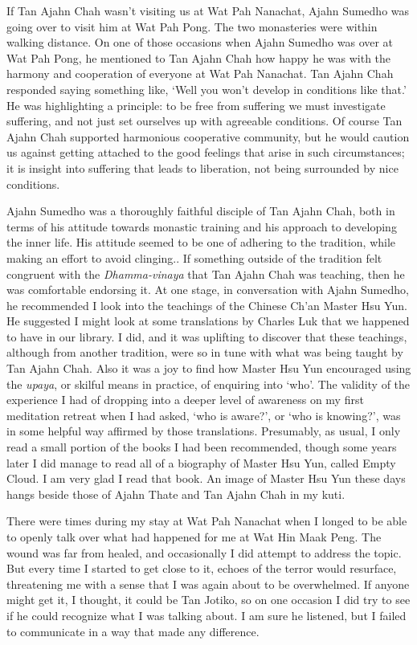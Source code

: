 If Tan Ajahn Chah wasn't visiting us at Wat Pah Nanachat, Ajahn Sumedho
was going over to visit him at Wat Pah Pong. The two monasteries were
within walking distance. On one of those occasions when Ajahn Sumedho
was over at Wat Pah Pong, he mentioned to Tan Ajahn Chah how happy he
was with the harmony and cooperation of everyone at Wat Pah Nanachat.
Tan Ajahn Chah responded saying something like, `Well you won't develop
in conditions like that.' He was highlighting a principle: to be free
from suffering we must investigate suffering, and not just set ourselves
up with agreeable conditions. Of course Tan Ajahn Chah supported
harmonious cooperative community, but he would caution us against
getting attached to the good feelings that arise in such circumstances;
it is insight into suffering that leads to liberation, not being
surrounded by nice conditions.

Ajahn Sumedho was a thoroughly faithful disciple of Tan Ajahn Chah, both
in terms of his attitude towards monastic training and his approach to
developing the inner life. His attitude seemed to be one of adhering to
the tradition, while making an effort to avoid clinging.. If something outside of the
tradition felt congruent with the \emph{Dhamma-vinaya} that Tan Ajahn
Chah was teaching, then he was comfortable endorsing it. At one stage,
in conversation with Ajahn Sumedho, he recommended I look into the
teachings of the Chinese Ch'an Master Hsu Yun\cite{hsu-yun}.
He suggested I might look at some translations by Charles Luk that we happened to have in our library. I did, and it was uplifting
to discover that these teachings, although from another tradition, were
so in tune with what was being taught by Tan Ajahn Chah. Also it was a
joy to find how Master Hsu Yun encouraged using the \emph{upaya}, or
skilful means in practice, of enquiring into `who'. The validity of the
experience I had of dropping into a deeper level of awareness on my
first meditation retreat when I had asked, `who is aware?', or `who is
knowing?', was in some helpful way affirmed by those translations.
Presumably, as usual, I only read a small portion of the books I had
been recommended, though some years later I did manage to read all of a
biography of Master Hsu Yun, called Empty Cloud\cite{hsu-yun-bio}.
I am very glad I read that book. An image of Master Hsu Yun
these days hangs beside those of Ajahn Thate and Tan Ajahn
Chah in my kuti.

There were times during my stay at Wat Pah Nanachat when I longed to be
able to openly talk over what had happened for me at Wat Hin Maak Peng.
The wound was far from healed, and occasionally I did attempt to address
the topic. But every time I started to get close to it, echoes of the
terror would resurface, threatening me with a sense that I was again
about to be overwhelmed. If anyone might get it, I thought, it could be
Tan Jotiko, so on one occasion I did try to see if he could recognize
what I was talking about. I am sure he listened, but I failed to
communicate in a way that made any difference.

